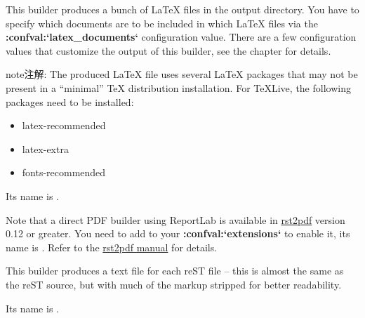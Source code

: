 \documentclass[letterpaper,10pt,english]{sphinxmanual}
\begin{document}
\label{builders:module-sphinx.builders.latex}

\begin{fulllineitems}
\label{builders:sphinx.builders.latex.LaTeXBuilder}
This builder produces a bunch of LaTeX files in the output directory.  You
have to specify which documents are to be included in which LaTeX files via
the {\color{red}\bfseries{}:confval:{}`latex\_documents{}`} configuration value.  There are a few
configuration values that customize the output of this builder, see the
chapter {\hyperref[config:latex\string-options]{}} for details.

\begin{notice}{note}{注解:}
The produced LaTeX file uses several LaTeX packages that may not be
present in a ``minimal'' TeX distribution installation.  For TeXLive,
the following packages need to be installed:
\begin{itemize}
\item {} 
latex-recommended

\item {} 
latex-extra

\item {} 
fonts-recommended

\end{itemize}
\end{notice}

Its name is .

\end{fulllineitems}


Note that a direct PDF builder using ReportLab is available in \href{http://rst2pdf.googlecode.com}{rst2pdf} version 0.12 or greater.  You need to add
 to your {\color{red}\bfseries{}:confval:{}`extensions{}`} to enable it, its name is
.  Refer to the \href{http://lateral.netmanagers.com.ar/static/manual.pdf}{rst2pdf manual} for details.
\label{builders:module-sphinx.builders.text}

\begin{fulllineitems}
\label{builders:sphinx.builders.text.TextBuilder}
This builder produces a text file for each reST file -- this is almost the
same as the reST source, but with much of the markup stripped for better
readability.

Its name is .


\end{fulllineitems}
\end{document}
